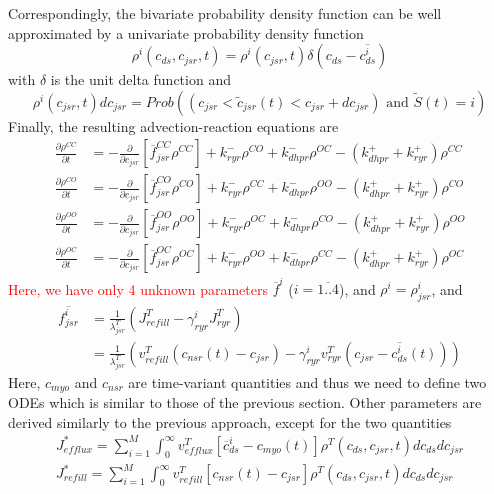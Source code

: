 Correspondingly, the bivariate probability density function can be
well approximated by a univariate probability density function
\begin{equation}
  \label{eq:222}
  \rho^i(c_{ds},c_{jsr},t) = \rho^i(c_{jsr},t)\delta(c_{ds}-\overline{c^i_{ds}})
\end{equation}
with $\delta$ is the unit delta function and
\begin{equation}
  \label{eq:224}
     \rho^i(c_{jsr},t) dc_{jsr} =  Prob \left((c_{jsr}<\tilde{c}_{jsr}(t) <
    c_{jsr} + dc_{jsr}) \text{ and } \tilde{S}(t)=i \right)
\end{equation}
Finally, the resulting advection-reaction equations are
\begin{equation}
  \label{eq:225}
    \begin{split}
    \frac{\partial \rho^{CC}}{\partial t} &=   -\frac{\partial}{\partial
    c_{jsr}}[\overline{f}^{CC}_{jsr}\rho^{CC}] + k^-_{ryr}\rho^{CO} + k^-_{dhpr} \rho^{OC} - (k^+_{dhpr}+k^+_{ryr})\rho^{CC} \\ 
  \frac{\partial \rho^{CO}}{\partial t} &=  -\frac{\partial}{\partial
    c_{jsr}}[\overline{f}^{CO}_{jsr}\rho^{CO}] + k^-_{ryr}\rho^{CC} + k^-_{dhpr}
  \rho^{OO} - (k^+_{dhpr}+k^+_{ryr}) \rho^{CO} \\
  \frac{\partial \rho^{OO}}{\partial t} &= -\frac{\partial}{\partial
    c_{jsr}}[\overline{f}^{OO}_{jsr}\rho^{OO}] + k^-_{ryr}\rho^{OC} + k^-_{dhpr}
  \rho^{CO} - (k^+_{dhpr}+k^+_{ryr}) \rho^{OO}   \\
  \frac{\partial \rho^{OC}}{\partial t} &=  -\frac{\partial}{\partial
    c_{jsr}}[\overline{f}^{OC}_{jsr}\rho^{OC}] + k^-_{ryr}\rho^{OO} + k^-_{dhpr}
  \rho^{CC} - (k^+_{dhpr}+k^+_{ryr}) \rho^{OC}  
  \end{split}
\end{equation}
\textcolor{red}{Here, we have only 4 unknown parameters} $\overline{f}^i$ ($i=\overline{1..4}$), and $\rho^i
= \rho^i_{jsr}$, and
\begin{equation}
  \label{eq:226}
  \begin{split}
      \overline{f^i_{jsr}} &= \frac{1}{\lambda^T_{jsr}}
  (J^T_{refill}-\gamma^i_{ryr}J^T_{ryr}) \\
  &=  \frac{1}{\lambda^T_{jsr}}
  (v^T_{refill} (c_{nsr}(t)-c_{jsr})-\gamma^i_{ryr}v^T_{ryr}(c_{jsr}-\overline{c^i_{ds}}(t)))
  \end{split}
\end{equation}
Here, $c_{myo}$ and $c_{nsr}$ are time-variant quantities and thus we
need to define two ODEs which is similar to those of the previous
section. Other parameters are derived similarly to the previous
approach, except for the two quantities
\begin{equation}
  \label{eq:234}
  \begin{split}
  J^*_{efflux} = \sum_{i=1}^M \int^\infty_0 v^T_{efflux} \left[ \overline{c}^i_{ds}
    - c_{myo}(t)  \right] \rho^T(c_{ds},c_{jsr}, t)dc_{ds}dc_{jsr}\\
  J^*_{refill} = \sum_{i=1}^M \int^\infty_0 v^T_{refill} \left[ c_{nsr}(t)
    - c_{jsr}  \right] \rho^T(c_{ds},c_{jsr}, t)dc_{ds}dc_{jsr}
\
  \end{split}
\end{equation}

